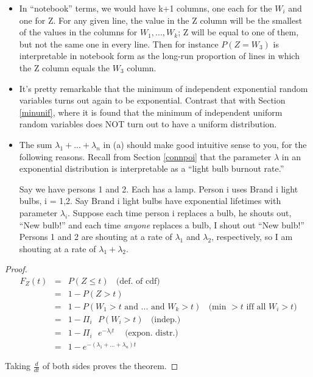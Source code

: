 \begin{itemize}

\item In ``notebook'' terms, we would have k+1 columns, one each for the
$W_i$ and one for Z.  For any given line, the value in the Z column will
be the smallest of the values in the columns for $W_1,...,W_k$; Z will
be equal to one of them, but not the same one in every line.  Then for
instance $P(Z = W_3)$ is interpretable in notebook form as the long-run
proportion of lines in which the Z column equals the $W_3$ column.

\item It's pretty remarkable that the minimum of independent exponential
random variables turns out again to be exponential.  Contrast that with
Section \ref{minunif}, where it is found that the minimum of independent
uniform random variables does NOT turn out to have a uniform
distribution.

\item The sum $\lambda_1+...+\lambda_n$ in (a) should make good
intuitive sense to you, for the following reasons.  Recall from Section
\ref{connpoi} that the parameter $\lambda$ in an exponential
distribution is interpretable as a ``light bulb burnout rate.''

Say we have persons 1 and 2.  Each has a lamp.  Person i uses Brand i
light bulbs, i = 1,2.  Say Brand i light bulbs have exponential
lifetimes with parameter $\lambda_i$.  Suppose each time person i
replaces a bulb, he shouts out, ``New bulb!'' and each time {\it anyone}
replaces a bulb, I shout out ``New bulb!'' Persons 1 and 2 are shouting
at a rate of $\lambda_1$ and $\lambda_2$, respectively, so I am shouting
at a rate of $\lambda_1 + \lambda_2$.

\end{itemize}

\begin{proof}

\begin{eqnarray}
F_{Z}(t) &=& P(Z \leq t) ~~~~ \textrm{(def. of cdf) }\\
&=& 1-P(Z>t) \\
&=& 1-P(W_{1}>t\textrm{ and }...\textrm{ and }W_{k}>t)  ~~~~
\textrm{(min $> t$ iff all $W_i > t$)} \\
&=& 1-\Pi_{i}\textrm{ } P(W_i > t)  ~~~~ \textrm{(indep.) }\\
&=& 1-\Pi_{i}\textrm{ }e^{-\lambda_{i}t} ~~~~ \textrm{ (expon. distr.)} \\
&=& 1 - e^{-(\lambda_1+...+\lambda_n) t}
\end{eqnarray}

Taking $\frac{d}{dt}$ of both sides proves the theorem.

\end{proof}


